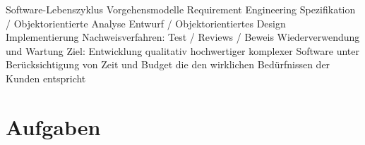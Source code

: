 \documentclass{lehramt-informatik-haupt}
\begin{document}
Software-Lebenszyklus
Vorgehensmodelle
Requirement Engineering
Spezifikation / Objektorientierte Analyse
Entwurf / Objektorientiertes Design
Implementierung
Nachweisverfahren: Test / Reviews / Beweis
Wiederverwendung und Wartung
Ziel:
Entwicklung qualitativ hochwertiger komplexer Software
unter Berücksichtigung von Zeit und Budget
die den wirklichen Bedürfnissen der Kunden entspricht


\chapter{Aufgaben}

\literatur
\end{document}
